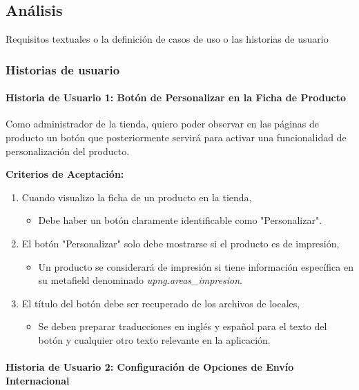 \documentclass[12pt]{article}
\newcommand{\subsubsubsection}[1]{\paragraph{#1}}
\begin{document}
\subsection{Análisis}
Requisitos textuales o la definición de casos de uso o las historias de usuario

\subsubsection{Historias de usuario}

\subsubsubsection{Historia de Usuario 1: Botón de Personalizar en la Ficha de Producto}\label{sec:historia1}

Como administrador de la tienda, quiero poder observar en las páginas de producto un botón que posteriormente servirá para activar una funcionalidad de personalización del producto.

\vspace{0.5cm}
\textbf{Criterios de Aceptación:}
\begin{enumerate}[label=\arabic*.]
    \item Cuando visualizo la ficha de un producto en la tienda,
          \begin{itemize}[label=--]
              \item Debe haber un botón claramente identificable como "Personalizar".
          \end{itemize}
    \item El botón "Personalizar" solo debe mostrarse si el producto es de impresión,
          \begin{itemize}[label=--]
              \item Un producto se considerará de impresión si tiene información específica en su metafield denominado \textit{upng.areas\_impresion}.
          \end{itemize}
    \item El título del botón debe ser recuperado de los archivos de locales,
          \begin{itemize}[label=--]
              \item Se deben preparar traducciones en inglés y español para el texto del botón y cualquier otro texto relevante en la aplicación.
          \end{itemize}
\end{enumerate}


\subsubsubsection{Historia de Usuario 2: Configuración de Opciones de Envío Internacional}\label{sec:historia2}
\end{document}
